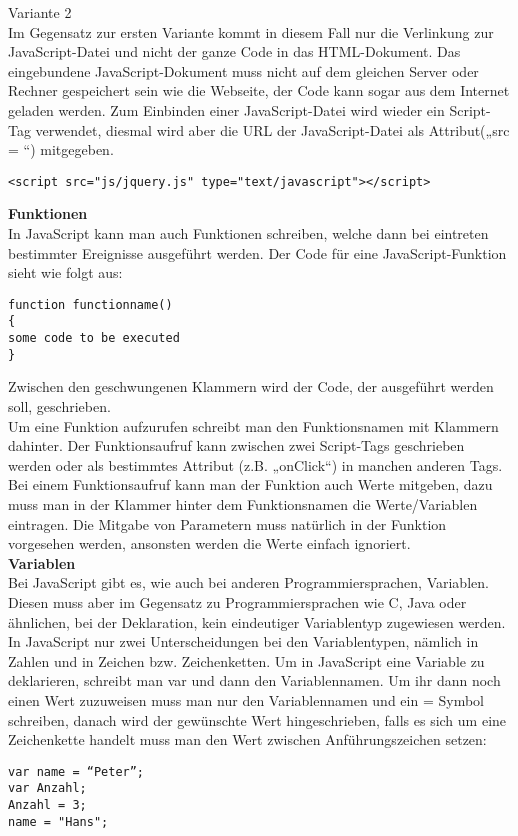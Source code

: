 Variante 2\\
Im Gegensatz zur ersten Variante kommt in diesem Fall nur die Verlinkung zur JavaScript-Datei und nicht der ganze Code in das HTML-Dokument. Das eingebundene JavaScript-Dokument muss nicht auf dem gleichen Server oder Rechner gespeichert sein wie die Webseite, der Code kann sogar aus dem Internet geladen werden. Zum Einbinden einer JavaScript-Datei wird wieder ein Script-Tag verwendet, diesmal wird aber die URL der JavaScript-Datei als Attribut(„src = “) mitgegeben.\\
\begin{lstlisting}
<script src="js/jquery.js" type="text/javascript"></script>
\end{lstlisting}

\textbf{Funktionen}\\
In JavaScript kann man auch Funktionen schreiben, welche dann bei eintreten bestimmter Ereignisse ausgeführt werden. Der Code für eine JavaScript-Funktion sieht wie folgt aus:\\
\begin{lstlisting}
function functionname()
{
some code to be executed
}
\end{lstlisting}
Zwischen den geschwungenen Klammern wird der Code, der ausgeführt werden soll, geschrieben.\\
Um eine Funktion aufzurufen schreibt man den Funktionsnamen mit Klammern dahinter. Der Funktionsaufruf kann zwischen zwei Script-Tags geschrieben werden oder als bestimmtes Attribut (z.B. „onClick“) in manchen anderen Tags.\\
Bei einem Funktionsaufruf kann man der Funktion auch Werte mitgeben, dazu muss man in der Klammer hinter dem Funktionsnamen die Werte/Variablen eintragen. Die Mitgabe von Parametern muss natürlich in der Funktion vorgesehen werden, ansonsten werden die Werte einfach ignoriert.\\

\textbf{Variablen}\\
Bei JavaScript gibt es, wie auch bei anderen Programmiersprachen, Variablen. Diesen muss aber im Gegensatz zu Programmiersprachen wie C, Java oder ähnlichen, bei der Deklaration, kein eindeutiger Variablentyp zugewiesen werden. In JavaScript nur zwei Unterscheidungen bei den Variablentypen, nämlich in Zahlen und in Zeichen bzw. Zeichenketten. 
Um in JavaScript eine Variable zu deklarieren, schreibt man var und dann den Variablennamen. Um ihr dann noch einen Wert zuzuweisen muss man nur den Variablennamen und ein = Symbol schreiben, danach wird der gewünschte Wert hingeschrieben, falls es sich um eine Zeichenkette handelt muss man den Wert zwischen Anführungszeichen setzen:\\
\begin{lstlisting} 
var name = “Peter”;
var Anzahl;
Anzahl = 3;
name = "Hans";
\end{lstlisting}

